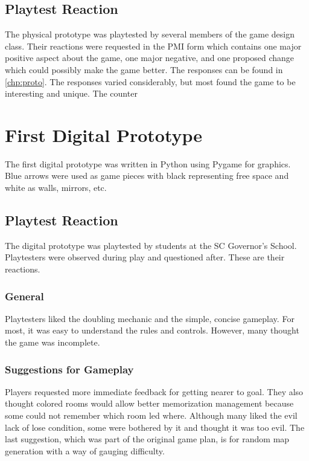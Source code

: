 \documentclass{scrreprt}
\begin{document}
			\subsection{Playtest Reaction}
				The physical prototype was playtested by several members of the game design class. Their reactions were requested in the PMI form which contains one major positive aspect about the game, one major negative, and one proposed change which could possibly make the game better. The responses can be found in \autoref{chp:proto}. The responses varied considerably, but most found the game to be interesting and unique. The counter 
		
		\section{First Digital Prototype}
			The first digital prototype was written in Python using Pygame for graphics. Blue arrows were used as game pieces with black representing free space and white as walls, mirrors, etc.
			
			\subsection{Playtest Reaction}
				The digital prototype was playtested by students at the SC Governor's School. Playtesters were observed during play and questioned after. These are their reactions.
				
				\subsubsection{General}
					Playtesters liked the doubling mechanic and the simple, concise gameplay. For most, it was easy to understand the rules and controls. However, many thought the game was incomplete.
					
				\subsubsection{Suggestions for Gameplay}
					Players requested more immediate feedback for getting nearer to goal. They also thought colored rooms would allow better memorization management because some could not remember which room led where. Although many liked the evil lack of lose condition, some were bothered by it and thought it was too evil. The last suggestion, which was part of the original game plan, is for random map generation with a way of gauging difficulty.
				
\end{document}
